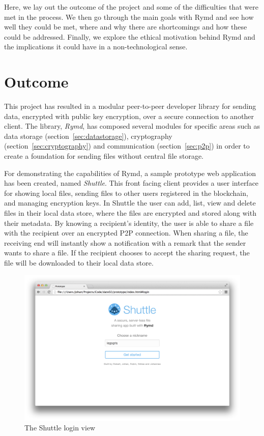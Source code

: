 
Here, we lay out the outcome of the project and some of the difficulties that were met in the process. We then go through the main goals with Rymd and see how well they could be met, where and why there are shortcomings and how these could be addressed. Finally, we explore the ethical motivation behind Rymd and the implications it could have in a non-technological sense.

\section{Outcome}
This project has resulted in a modular peer-to-peer developer library for sending data, encrypted with public key encryption, over a secure connection to another client. The library, \emph{Rymd}, has composed several modules for specific areas such as data storage (section~\ref{sec:datastorage}), cryptography (section~\ref{sec:cryptography}) and communication (section~\ref{sec:p2p}) in order to create a foundation for sending files without central file storage.

For demonstrating the capabilities of Rymd, a sample prototype web application has been created, named \emph{Shuttle}. This front facing client provides a user interface for showing local files, sending files to other users registered in the blockchain, and managing encryption keys. In Shuttle the user can add, list, view and delete files in their local data store, where the files are encrypted and stored along with their metadata. By knowing a recipient's identity, the user is able to share a file with the recipient over an encrypted P2P connection. When sharing a file, the receiving end will instantly show a notification with a remark that the sender wants to share a file. If the recipient chooses to accept the sharing request, the file will be downloaded to their local data store.

\begin{figure}[h]
\centering
\includegraphics[width=\textwidth,height=0.2\paperheight,keepaspectratio
]{figures/shuttle-login}
\caption{The Shuttle login view}
\label{fig:shuttle-login}
\end{figure}

